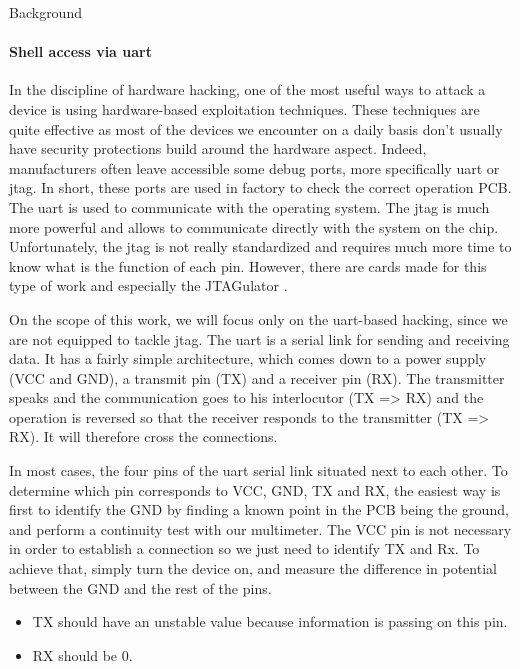 \begin{chaptercover}{Background}
\paragraph{Shell access via \acrshort{uart}}\label{subsec:uart-jtag} In the discipline of hardware hacking, one of the most useful ways to attack a device is using hardware-based exploitation techniques. These techniques are quite effective as most of the devices we encounter on a daily basis don’t usually have security protections build around the hardware aspect. Indeed, manufacturers often leave accessible some debug ports, more specifically \acrfull{uart} or \acrfull{jtag}. In short, these ports are used in factory to check the correct operation PCB. The \acrshort{uart} is used to communicate with the operating system. The \acrshort{jtag} is much more powerful and allows to communicate directly with the system on the chip. Unfortunately, the \acrshort{jtag} is not really standardized and requires much more time to know what is the function of each pin. However, there are cards made for this type of work and especially the JTAGulator \cite{jtagulator}.

\begin{indentbox}{1cm}
On the scope of this work, we will focus only on the \acrshort{uart}-based hacking, since we are not equipped to tackle \acrshort{jtag}. The \acrshort{uart} is a serial link for sending and receiving data. It has a fairly simple architecture, which comes down to a power supply (VCC and GND), a transmit pin (TX) and a receiver pin (RX). The transmitter speaks and the communication goes to his interlocutor (TX => RX) and the operation is reversed so that the receiver responds to the transmitter (TX => RX). It will therefore cross the connections.

In most cases, the four pins of the \acrshort{uart} serial link situated next to each other. To determine which pin corresponds to VCC, GND, TX and RX, the easiest way is first to identify the GND by finding a known point in the PCB being the ground, and perform a continuity test with our multimeter. The VCC pin is not necessary in order to establish a connection so we just need to identify TX and Rx. To achieve that, simply turn the device on, and measure the difference in potential between the GND and the rest of the pins.
\begin{itemize}[itemsep=0.1cm,topsep=0.1cm]
  \item TX should have an unstable value because information is passing on this pin.
  \item RX should be 0.
\end{itemize}
\end{indentbox}


\end{chaptercover}
